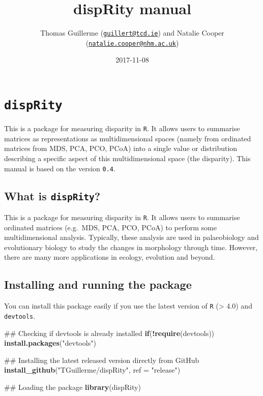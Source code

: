 \documentclass[]{book}
\title{dispRity manual}
\author{Thomas Guillerme
(\href{mailto:guillert@tcd.ie}{\nolinkurl{guillert@tcd.ie}}) and Natalie
Cooper
(\href{mailto:natalie.cooper@nhm.ac.uk}{\nolinkurl{natalie.cooper@nhm.ac.uk}})}
\date{2017-11-08}
\newenvironment{Shaded}{\begin{snugshade}}{\end{snugshade}}
\newcommand{\KeywordTok}[1]{\textcolor[rgb]{0.13,0.29,0.53}{\textbf{#1}}}
\newcommand{\DataTypeTok}[1]{\textcolor[rgb]{0.13,0.29,0.53}{#1}}
\newcommand{\StringTok}[1]{\textcolor[rgb]{0.31,0.60,0.02}{#1}}
\newcommand{\ControlFlowTok}[1]{\textcolor[rgb]{0.13,0.29,0.53}{\textbf{#1}}}
\newcommand{\OperatorTok}[1]{\textcolor[rgb]{0.81,0.36,0.00}{\textbf{#1}}}
\newcommand{\NormalTok}[1]{#1}
\theoremstyle{definition}
\theoremstyle{definition}
\theoremstyle{remark}
\begin{document}
\maketitle

{
\setcounter{tocdepth}{1}
\tableofcontents
}
\chapter{\texorpdfstring{\texttt{dispRity}}{dispRity}}\label{disprity}

This is a package for measuring disparity in \texttt{R}. It allows users
to summarise matrices as representations as multidimensional spaces
(namely from ordinated matrices from MDS, PCA, PCO, PCoA) into a single
value or distribution describing a specific aspect of this
multidimensional space (the disparity). This manual is based on the
version \texttt{0.4}.

\section{\texorpdfstring{What is
\texttt{dispRity}?}{What is dispRity?}}\label{what-is-disprity}

This is a package for measuring disparity in \texttt{R}. It allows users
to summarise ordinated matrices (e.g.~MDS, PCA, PCO, PCoA) to perform
some multidimensional analysis. Typically, these analysis are used in
palaeobiology and evolutionary biology to study the changes in
morphology through time. However, there are many more applications in
ecology, evolution and beyond.

\section{Installing and running the
package}\label{installing-and-running-the-package}

You can install this package easily if you use the latest version of
\texttt{R} (\textgreater{} 4.0) and \texttt{devtools}.

\begin{Shaded}
\begin{Highlighting}[]
\NormalTok{## Checking if devtools is already installed}
\ControlFlowTok{if}\NormalTok{(}\OperatorTok{!}\KeywordTok{require}\NormalTok{(devtools)) }\KeywordTok{install.packages}\NormalTok{(}\StringTok{"devtools"}\NormalTok{)}

\NormalTok{## Installing the latest released version directly from GitHub}
\KeywordTok{install_github}\NormalTok{(}\StringTok{"TGuillerme/dispRity"}\NormalTok{, }\DataTypeTok{ref =} \StringTok{"release"}\NormalTok{)}

\NormalTok{## Loading the package}
\KeywordTok{library}\NormalTok{(dispRity)}
\end{Highlighting}
\end{Shaded}
\end{document}
